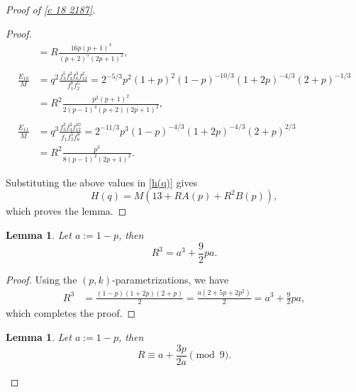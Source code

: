 \documentclass[12pt]{article}
\numberwithin{equation}{section}
\theoremstyle{plain}
\numberwithin{theorem}{section}
\newtheorem{lemma}[theorem]{Lemma}
\theoremstyle{definition}
\theoremstyle{remark}
\begin{document}
\begin{proof}[Proof of \eqref{c 18 2187}]
\begin{proof}
\begin{align*}
&=
R
\frac{16p(p+1)^4}
     {(p+2)^5(2p+1)^2},\\ \\
\frac{E_{10}}{M} &= q^2
\frac{f_3^5f_4^2f_6^3f_{12}^2}
     {f_1^7f_2^5}
=
2^{-5/3}p^2(1+p)^2
(1-p)^{-10/3}
(1+2p)^{-4/3}
(2+p)^{-1/3}
\\
&=
R^2
\frac{p^2(p+1)^2}
     {2(p-1)^4(p+2)(2p+1)^2},\\ \\
\frac{E_{11}}{M} &= q^3
\frac{f_3^3f_4^2f_{12}^{10}}
     {f_1f_2^5f_6^9}
=
2^{-11/3}p^3
(1-p)^{-4/3}
(1+2p)^{-4/3}
(2+p)^{2/3}
\\
&=
R^2
\frac{p^3}
     {8(p-1)^2(2p+1)^2}.
\end{align*}

Substituting the above values in \eqref{h(q)} gives
\begin{equation*}
H(q)=M\left(13+RA(p)+R^2B(p)\right),
\end{equation*}
which proves the lemma.
\end{proof}


\begin{lemma}\label{lem:R-cubic}
Let $a:=1-p$, then
\begin{equation*}
R^3=a^3+\frac92pa.
\end{equation*}
\end{lemma}

\begin{proof}
Using the $(p,k)$-parametrizations, we have
\begin{align*}
R^3&=\frac{(1-p)(1+2p)(2+p)}{2}=\frac{a(2+5p+2p^2)}{2}=a^3+\frac92pa,
\end{align*}
which completes the proof.
\end{proof}


\begin{lemma}\label{lem:R-mod9}
Let $a:=1-p$, then
\begin{equation*}
R\equiv a+\frac{3p}{2a}\pmod9.
\end{equation*}
\end{lemma}


\end{proof}
\end{document}

